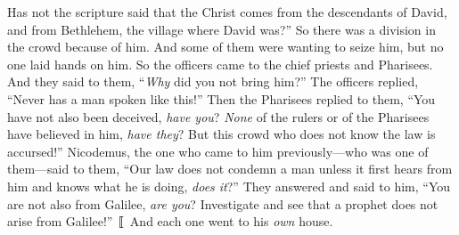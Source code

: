 \begin{biblechapter}
\verse Has not the scripture said that the Christ comes from the descendants of David, and from Bethlehem, the village where David was?”
\verse So there was a division in the crowd because of him.
\verse And some of them were wanting to seize him, but no one laid hands on him.
\verse So the officers came to the chief priests and Pharisees. And they said to them, “\textit{Why} did you not bring him?”
\verse The officers replied, “Never has a man spoken like this!”
\verse Then the Pharisees replied to them, “You have not also been deceived, \textit{have you}?
\verse \textit{None} of the rulers or of the Pharisees have believed in him, \textit{have they}?
\verse But this crowd who does not know the law is accursed!”
\verse Nicodemus, the one who came to him previously—who was one of them—said to them,
\verse “Our law does not condemn a man unless it first hears from him and knows what he is doing, \textit{does it}?”
\verse They answered and said to him, “You are not also from Galilee, \textit{are you}? Investigate and see that a prophet does not arise from Galilee!” 〚
\verse And each one went to his \textit{own} house.
\end{biblechapter}

